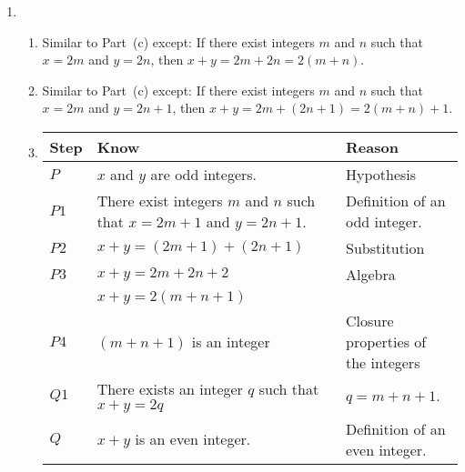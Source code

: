 \begin{enumerate}
\item \begin{enumerate}  
\item Similar to Part~(c) except:  If there exist integers $m$ and $n$ such that $x = 2m$ and 
$y = 2n$, then $x + y = 2m + 2n = 2 \left(m + n \right)$. 

\item Similar to Part~(c) except:  If there exist integers $m$ and $n$ such that $x = 2m$ and 
$y = 2n+1$, then $x + y = 2m + \left(2n + 1 \right) = 2 \left(m + n \right) + 1$. 

\item \begin{tabular}[t]{|p{0.4in}|p{1.6in}|p{1.6in}|}
  \hline
  \textbf{Step}  &  \textbf{Know}  &  \textbf{Reason} \\ \hline
  $P$  &  $x$ and $y$ are odd integers.  &  Hypothesis \\ \hline
  $P1$ &  There exist integers $m$ and $n$ such that $x = 2m+1$ and $y = 2n+1$.  &  Definition of an odd integer. \\ \hline
  $P2$  &  $x + y = \left( 2m+1 \right) + \left( 2n+1 \right)$  &  Substitution \\ \hline
  $P3$  &  $x + y = 2m + 2n + 2$  &  Algebra  \\
        &  $x + y = 2 \left( {m+n+1} \right)$  &  \\ \hline
  $P4$  &  $\left( {m+n+1} \right)$ is an integer  &  Closure properties of the integers \\ \hline
  $Q1$  &  There exists an integer $q$ such that $x + y = 2q$  & $q = m+n+1$.  \\ \hline
  $Q$  &  $x + y$ is an even integer. &  Definition of an even integer. \\ \hline
\end{tabular}
\end{enumerate}
\end{enumerate}



